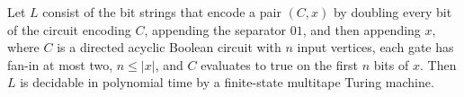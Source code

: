 \begin{theorem}
\label{BoolCircuit.CVALPrefix_mem_P}
\leanok
{}
Let $L$ consist of the bit strings that encode a pair $(C,x)$ by doubling every bit of
the circuit encoding $C$, appending the separator $01$, and then appending $x$, where
$C$ is a directed acyclic Boolean circuit with $n$ input vertices, each gate has fan-in
at most two, $n\leq |x|$, and $C$ evaluates to true on the first $n$ bits of $x$. Then
$L$ is decidable in polynomial time by a finite-state multitape Turing machine.
\end{theorem}
